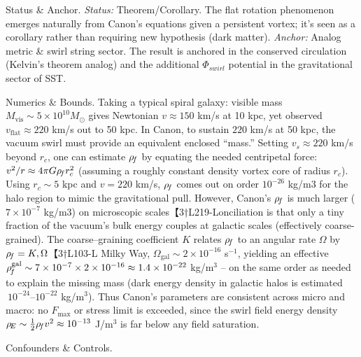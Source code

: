 \documentclass[11pt]{article}
\begin{document}
Status & Anchor. \textit{Status:} Theorem/Corollary. The flat rotation phenomenon emerges naturally from Canon’s equations given a persistent vortex; it’s seen as a corollary rather than requiring new hypothesis (dark matter). \textit{Anchor:} Analog metric & swirl string sector. The result is anchored in the conserved circulation (Kelvin’s theorem analog) and the additional $\Phi_{swirl}$ potential in the gravitational sector of SST.


Numerics & Bounds. Taking a typical spiral galaxy: visible mass $M_{\text{vis}} \sim 5\times10^{10} M_\odot$ gives Newtonian $v \approx 150$ km/s at 10 kpc, yet observed $v_{\text{flat}}\approx 220$ km/s out to 50 kpc. In Canon, to sustain $220$ km/s at 50 kpc, the vacuum swirl must provide an equivalent enclosed “mass.” Setting $v_{s}\approx 220$ km/s beyond $r_c$, one can estimate $\rho_{\!f}$ by equating the needed centripetal force: $v^2/r \approx 4\pi G \rho_{\!f} r_c^2$ (assuming a roughly constant density vortex core of radius $r_c$). Using $r_c \sim 5$ kpc and $v=220$ km/s, $\rho_{\!f}$ comes out on order $10^{-26}$ kg/m$3$ for the halo region to mimic the gravitational pull. However, Canon’s $\rho_{\!f}$ is much larger ($7\times10^{-7}$ kg/m$3$) on microscopic scales【3†L219-Lonciliation is that only a tiny fraction of the vacuum’s bulk energy couples at galactic scales (effectively coarse-grained). The coarse–graining coefficient $K$ relates $\rho_{\!f}$ to an angular rate $\Omega$ by $\rho_{\!f} = K,\Omega$【3†L103-L Milky Way, $\Omega_{\text{gal}}\sim 2\times10^{-16}$ s$^{-1}$, yielding an effective $\rho_{\!f}^{\text{gal}} \sim 7\times10^{-7} \times 2\times10^{-16} \approx 1.4\times10^{-22}$ kg/m$^3$ – on the same order as needed to explain the missing mass (dark energy density in galactic halos is estimated $~10^{-24}$–$10^{-22}$ kg/m$^3$). Thus Canon’s parameters are consistent across micro and macro: no $F_{\max}$ or stress limit is exceeded, since the swirl field energy density $\rho_{\!E} \sim \tfrac{1}{2}\rho_{\!f} v^2 \approx 10^{-13}$ J/m$^3$ is far below any field saturation.


Confounders & Controls.
\end{document}
